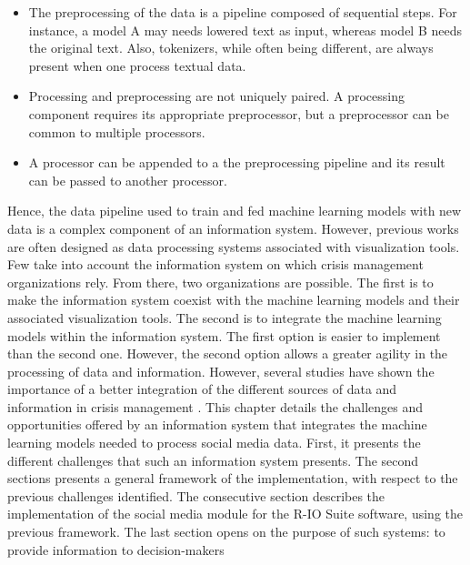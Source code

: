 \begin{itemize}
    \item The preprocessing of the data is a pipeline composed of sequential steps.
          For instance, a model A may needs lowered text as input, whereas model B needs the original text.
          Also, tokenizers, while often being different, are always present when one process textual data.
    \item Processing and preprocessing are not uniquely paired. A processing component requires its appropriate preprocessor, but a preprocessor can be common to multiple processors.
    \item A processor can be appended to a the preprocessing pipeline and its result can be passed to another processor.
\end{itemize}

Hence, the data pipeline used to train and fed machine learning models with new data is a complex component of an information system.
However, previous works are often designed as data processing systems associated with visualization tools.
Few take into account the information system on which crisis management organizations rely.
From there, two organizations are possible.
The first is to make the information system coexist with the machine learning models and their associated visualization tools.
The second is to integrate the machine learning models within the information system.
The first option is easier to implement than the second one.
However, the second option allows a greater agility in the processing of data and information.
However, several studies have shown the importance of a better integration of the different sources of data and information in crisis management \parencite{comesBringingStructureDisaster2015,tapiaScaling911Texting2016}.
This chapter details the challenges and opportunities offered by an information system that integrates the machine learning models needed to process social media data.
First, it presents the different challenges that such an information system presents.
The second sections presents a general framework of the implementation, with respect to the previous challenges identified.
The consecutive section describes the implementation of the social media module for the R-IO Suite software, using the previous framework.
The last section opens on the purpose of such systems: to provide information to decision-makers

